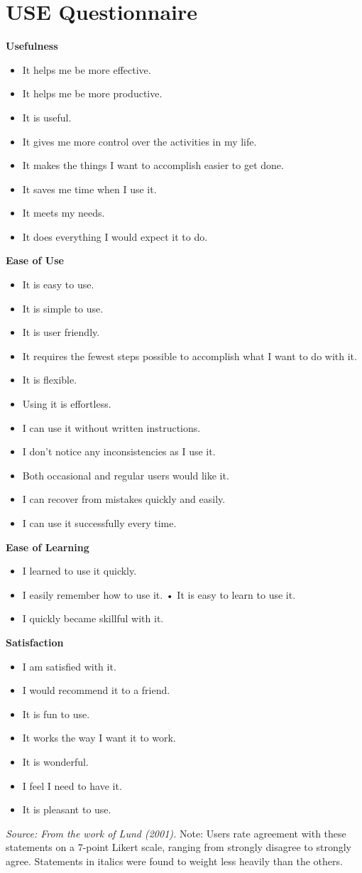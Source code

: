 \chapter{USE Questionnaire}\label{apendixb}
\begin{singlespace}
\small
\textbf{Usefulness}
\begin{itemize}
\item It helps me be more effective.
\item It helps me be more productive.
\item It is useful.
\item It gives me more control over the activities in my life.
\item It makes the things I want to accomplish easier to get done.
\item It saves me time when I use it.
\item It meets my needs.
\item It does everything I would expect it to do.
\end{itemize}
\small
\textbf{Ease of Use}
\begin{itemize}
\item It is easy to use.
\item It is simple to use.
\item It is user friendly.
\item It requires the fewest steps possible to accomplish what I want to do with it.
\item It is flexible.
\item Using it is effortless.
\item I can use it without written instructions.
\item I don't notice any inconsistencies as I use it.
\item Both occasional and regular users would like it.
\item I can recover from mistakes quickly and easily.
\item I can use it successfully every time.
\end{itemize}
\small
\textbf{Ease of Learning}
\begin{itemize}
\item I learned to use it quickly.
\item I easily remember how to use it. • It is easy to learn to use it.
\item I quickly became skillful with it.
\end{itemize}
\small
\textbf{Satisfaction}
\begin{itemize}
\item I am satisfied with it.
\item I would recommend it to a friend. 
\item It is fun to use.
\item It works the way I want it to work.
\item It is wonderful.
\item I feel I need to have it.
\item It is pleasant to use.
\end{itemize}
\small
\end{singlespace}
\textit{Source: From the work of Lund (2001).}
Note: Users rate agreement with these statements on a 7-point Likert
scale, ranging from strongly disagree to strongly agree. Statements in
italics were found to weight less heavily than the others.

